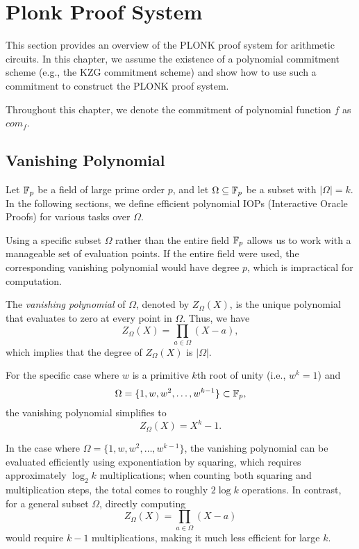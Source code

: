 \chapter{Plonk Proof System}
This section provides an overview of the PLONK proof system for arithmetic circuits.
In this chapter, we assume the existence of a polynomial commitment scheme (e.g., the KZG commitment scheme) and show how to use such a commitment to construct the PLONK proof system.

Throughout this chapter, we denote the commitment of polynomial function $f$ as $com_f$.

\section{Vanishing Polynomial}
Let $\mathbb{F}_p$ be a field of large prime order $p$, and let $\Omega \subseteq \mathbb{F}_p$ be a subset with $|\Omega| = k$.
In the following sections, we define efficient polynomial IOPs (Interactive Oracle Proofs) for various tasks over $\Omega$. 

\begin{remark}
    Using a specific subset $\Omega$ rather than the entire field $\mathbb{F}_p$ allows us to work with a manageable set of evaluation points. 
    If the entire field were used, the corresponding vanishing polynomial would have degree $p$, which is impractical for computation.
\end{remark}

\begin{definition} 
    The \textit{vanishing polynomial} of $\Omega$, denoted by $Z_{\Omega}(X)$, is the unique polynomial that evaluates to zero at every point in $\Omega$. 
Thus, we have
\[
    Z_{\Omega}(X) = \prod_{a \in \Omega} (X - a),
\]
which implies that the degree of $Z_{\Omega}(X)$ is $|\Omega|$.
\end{definition}


For the specific case where $w$ is a primitive $k$th root of unity (i.e., $w^k = 1$) and 
\[
    \Omega = \{1, w, w^2, \ldots, w^{k-1}\} \subset \mathbb{F}_p,
\]
the vanishing polynomial simplifies to
\[
    Z_{\Omega}(X) = X^k - 1.
\]

\begin{remark}
    In the case where $\Omega = \{1, w, w^2, \ldots, w^{k-1}\}$, the vanishing polynomial can be evaluated efficiently using exponentiation by squaring, which requires approximately $\log_2 k$ multiplications; when counting both squaring and multiplication steps, the total comes to roughly $2\log k$ operations. 
    In contrast, for a general subset $\Omega$, directly computing 
    \[
    Z_{\Omega}(X) = \prod_{a \in \Omega} (X - a)
    \]
    would require $k-1$ multiplications, making it much less efficient for large $k$.
\end{remark}

